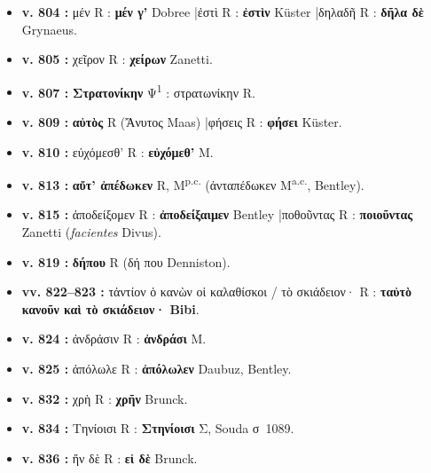 \documentclass[10pt, a4paper, twoside]{book}
\renewcommand{\_}{\origunderscore\penalty0\relax}
\providecommand{\italique}[1]{\emph{#1}}
\providecommand{\lecon}[1]{\textbf{#1}}
\providecommand{\expo}[1]{\textsuperscript{#1}}
\providecommand{\Mon}{M}
\providecommand{\PsiUn}{\textgreek{Ψ}\textsuperscript{1}}
\providecommand{\espApp}{\hspace{0.5em}|\hspace{0.5em}}
\begin{document}
\begin{itemize}
\begin{itemize}
    \item \textbf{v. 804 :} μέν R : \lecon{μέν γ'} Dobree \espApp ἐστὶ R : \lecon{ἐστὶν} Küster \espApp δηλαδῆ R : \lecon{δῆλα δὲ} Grynaeus.
    \item \textbf{v. 805 :} χεῖρον R : \lecon{χείρων} Zanetti.
    \item \textbf{v. 807 :} \lecon{Στρατονίκην} \PsiUn{} : στρατωνίκην R.
    \item \textbf{v. 809 :} \lecon{αὐτὸς} R (Ἄνυτος Maas) \espApp φήσεις R : \lecon{φήσει} Küster.
    \item \textbf{v. 810 :} εὐχόμεσθ' R : \lecon{εὐχόμεθ'} \Mon{}.
    \item \textbf{v. 813 :} \lecon{αὔτ' ἀπέδωκεν} R, \Mon\expo{p.c.} (ἀνταπέδωκεν \Mon\expo{a.c.}, Bentley).
    \item \textbf{v. 815 :} ἀποδείξομεν R : \lecon{ἀποδείξαιμεν} Bentley \espApp ποθοῦντας R : \lecon{ποιοῦντας} Zanetti (\italique{facientes} Divus).
    \item \textbf{v. 819 :} \lecon{δήπου} R (δή που Denniston).
    \item \textbf{vv. 822–823 :} τἀντίον ὁ κανὼν οἱ καλαθίσκοι / τὸ σκιάδειον· R : \lecon{ταὐτὸ κανοῦν καὶ τὸ σκιάδειον·} \lecon{Bibi}.
    \item \textbf{v. 824 :} ἀνδράσιν R : \lecon{ἀνδράσι} \Mon{}.
    \item \textbf{v. 825 :} ἀπόλωλε R : \lecon{ἀπόλωλεν} Daubuz, Bentley.
    \item \textbf{v. 832 :} χρὴ R : \lecon{χρῆν} Brunck.
    \item \textbf{v. 834 :} Τηνίοισι R : \lecon{Στηνίοισι} Σ, Souda σ~1089.
    \item \textbf{v. 836 :} ἤν δὲ R : \lecon{εἰ δὲ} Brunck.
  \end{itemize}
\end{itemize}
\end{document}
